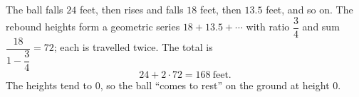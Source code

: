 The ball falls $24$ feet, then rises and falls $18$ feet, then $13.5$ feet, and so on. The rebound heights form a geometric series $18+13.5+\cdots$ with ratio $\dfrac{3}{4}$ and sum $\dfrac{18}{1-\dfrac{3}{4}}=72$; each is travelled twice. The total is
\[24+2\cdot72=\boxed{168}\ \text{feet}.\]
The heights tend to $0$, so the ball ``comes to rest'' on the ground at height $0$.
